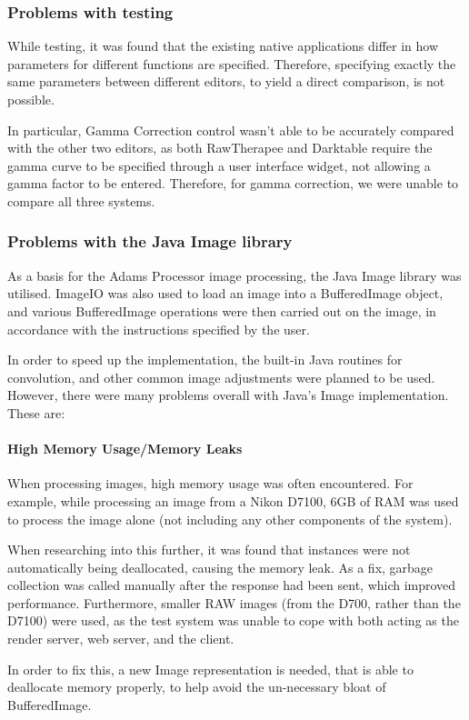 \documentclass[10pt,a4paper]{article}
\begin{document}
\subsubsection{Problems with testing}
While testing, it was found that the existing native applications differ in how parameters for different functions are specified.
Therefore, specifying exactly the same parameters between different editors, to yield a direct comparison, is not possible.

In particular, Gamma Correction control wasn't able to be accurately compared with the other two editors, as both RawTherapee and
Darktable require the gamma curve to be specified through a user interface widget, not allowing a gamma factor to be entered. 
Therefore, for gamma correction, we were unable to compare all three systems.

\subsubsection{Problems with the Java Image library}
As a basis for the Adams Processor image processing, the Java Image library was utilised.
ImageIO was also used to load an image into a BufferedImage object, and various BufferedImage operations 
were then carried out on the image, in accordance with the instructions specified by the user.

In order to speed up the implementation, the built-in Java routines for convolution, and other common image
adjustments were planned to be used. However, there were many problems overall with Java's Image implementation.
These are:
\paragraph{High Memory Usage/Memory Leaks}
When processing images, high memory usage was often encountered. For example, while processing an image from
a Nikon D7100, 6GB of RAM was used to process the image alone (not including any other components of the system).

When researching into this further, it was found that instances were not automatically being deallocated,
causing the memory leak. As a fix, garbage collection was called manually after the response had been sent,
which improved performance. Furthermore, smaller RAW images (from the D700, rather than the D7100) were used, as the test system was unable to cope
with both acting as the render server, web server, and the client.

In order to fix this, a new Image representation is needed, that is able to deallocate memory properly, to help avoid the un-necessary bloat of
BufferedImage.
\end{document}
